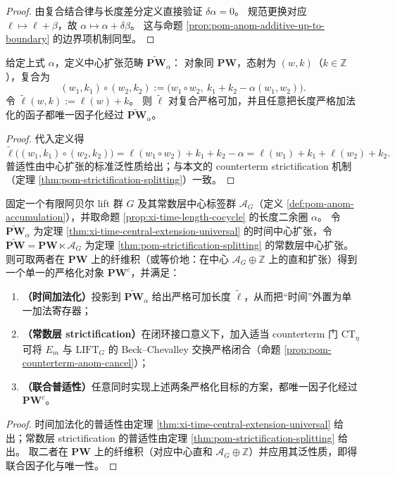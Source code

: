 \begin{proof}
由复合结合律与长度差分定义直接验证
\(
\delta\alpha=0
\)。
规范更换对应 \(\ell\mapsto \ell+\beta\)，故
\(
\alpha\mapsto \alpha+\delta\beta
\)。
这与命题 \ref{prop:pom-anom-additive-up-to-boundary} 的边界项机制同型。
\end{proof}

\begin{theorem}[时间中心扩张的普适消缺]\label{thm:xi-time-central-extension-universal}
给定上式 \(\alpha\)，定义中心扩张范畴 \(\widetilde{\mathbf{PW}}_{\alpha}\)：
对象同 \(\mathbf{PW}\)，态射为 \((w,k)\)（\(k\in\mathbb Z\)），复合为
\[
(w_1,k_1)\circ(w_2,k_2):=
\bigl(w_1\circ w_2,\ k_1+k_2-\alpha(w_1,w_2)\bigr).
\]
令
\(
\widetilde\ell(w,k):=\ell(w)+k
\)。
则 \(\widetilde\ell\) 对复合严格可加，并且任意把长度严格加法化的函子都唯一因子化经过 \(\widetilde{\mathbf{PW}}_{\alpha}\)。
\end{theorem}

\begin{proof}
代入定义得
\[
\widetilde\ell\bigl((w_1,k_1)\circ(w_2,k_2)\bigr)
=\ell(w_1\circ w_2)+k_1+k_2-\alpha
=\ell(w_1)+k_1+\ell(w_2)+k_2.
\]
普适性由中心扩张的标准泛性质给出；与本文的 counterterm strictification 机制（定理 \ref{thm:pom-strictification-splitting}）一致。
\end{proof}

\begin{corollary}\label{cor:xi-double-central-extension-universal-strictification}
固定一个有限阿贝尔 lift 群 \(G\) 及其常数层中心标签群 \(\mathcal{A}_G\)（定义 \ref{def:pom-anom-accumulation}），并取命题 \ref{prop:xi-time-length-cocycle} 的长度二余圈 \(\alpha\)。
令 \(\widetilde{\mathbf{PW}}_{\alpha}\) 为定理 \ref{thm:xi-time-central-extension-universal} 的时间中心扩张，令
\(\widetilde{\mathbf{PW}}=\mathbf{PW}\ltimes\mathcal{A}_G\)
为定理 \ref{thm:pom-strictification-splitting} 的常数层中心扩张。
则可取两者在 \(\mathbf{PW}\) 上的纤维积（或等价地：在中心 \(\mathcal{A}_G\oplus\mathbb Z\) 上的直和扩张）得到一个单一的严格化对象 \(\mathbf{PW}^{c}\)，并满足：
\begin{enumerate}
  \item \textbf{（时间加法化）}投影到 \(\widetilde{\mathbf{PW}}_{\alpha}\) 给出严格可加长度 \(\widetilde\ell\)，从而把“时间”外置为单一加法寄存器；
  \item \textbf{（常数层 strictification）}在闭环接口意义下，加入适当 counterterm 门 \(\mathrm{CT}_\eta\) 可将 \(E_m\) 与 \(\mathrm{LIFT}_G\) 的 Beck--Chevalley 交换严格闭合（命题 \ref{prop:pom-counterterm-anom-cancel}）；
  \item \textbf{（联合普适性）}任意同时实现上述两条严格化目标的方案，都唯一因子化经过 \(\mathbf{PW}^{c}\)。
\end{enumerate}
\end{corollary}
\begin{proof}
时间加法化的普适性由定理 \ref{thm:xi-time-central-extension-universal} 给出；常数层 strictification 的普适性由定理 \ref{thm:pom-strictification-splitting} 给出。
取二者在 \(\mathbf{PW}\) 上的纤维积（对应中心直和 \(\mathcal{A}_G\oplus\mathbb Z\)）并应用其泛性质，即得联合因子化与唯一性。
\end{proof}

